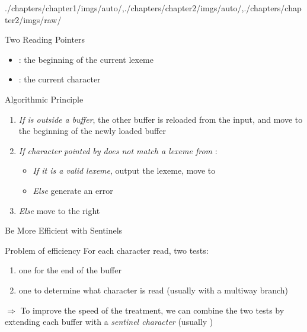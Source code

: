 \begin{graphicspathcontext}{{./chapters/chapter1/imgs/auto/},{./chapters/chapter2/imgs/auto/},{./chapters/chapter2/imgs/raw/}}
\begin{bibunit}[apalike]
\begin{frame}[t]{{Two Reading} Pointers}
	\begin{center}
		{}
	\end{center}
	\begin{itemize}
	\item {}: the beginning of the current lexeme
	\item {}: the current character
	\end{itemize}
	\vspace{.25cm}
	\begin{block}{Algorithmic Principle}
		\begin{enumerate}
			\item \emph{If  is outside a buffer}, the other buffer is reloaded from the input, and move  to the beginning of the newly loaded buffer
			\item \emph{If character pointed by  does not match a lexeme from }:
				\begin{itemize}
					\item \emph{If it is a valid lexeme}, output the lexeme, move  to 
					\item \emph{Else} generate an error
				\end{itemize}
			\item \emph{Else} move  to the right
		\end{enumerate}
	\end{block}
\end{frame}

\begin{frame}{{Be More Efficient} with Sentinels}
	\begin{alertblock}{Problem of efficiency}
		For each character read, two tests: \begin{enumerate}
		\item one for the end of the buffer
		\item one to determine what character is read (usually with a multiway branch)
		\end{enumerate}
	\end{alertblock}
	\vspace{.5cm}
	$\Rightarrow$ To improve the speed of the treatment, we can combine the two tests by extending each buffer with a \emph{sentinel character} (usually ) \\
	\vspace{.5cm}
	\begin{center}
	\end{center}
\end{frame}


\end{bibunit}
\end{graphicspathcontext}
